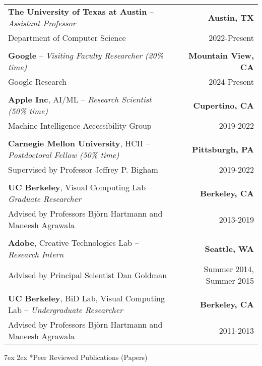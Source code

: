 \documentclass[letterpaper]{article}
\makeatletter
\renewcommand\section{\@startsection {section}{1}{\z@}%
      {7ex}%
      {2ex}%
      {\normalfont\Large\bfseries\SS@sectfont}}
\makeatother
\begin{document}
\begin{tabularx}{\textwidth}{Xr}

	\textbf{The University of Texas at Austin} -- \textit{Assistant Professor} & \textbf{Austin, TX} \\
	Department of Computer Science & 2022-Present \\
	\\

    \textbf{Google} -- \textit{Visiting Faculty Researcher (20\% time)} & \textbf{Mountain View, CA} \\
    Google Research & 2024-Present \\
    \\

	\textbf{Apple Inc}, AI/ML -- \textit{Research Scientist (50\% time)} & \textbf{Cupertino, CA} \\
	Machine Intelligence Accessibility Group & 2019-2022 \\
	\\

	\textbf{Carnegie Mellon University}, HCII -- \textit{Postdoctoral Fellow (50\% time)} & \textbf{Pittsburgh, PA} \\
	Supervised by Professor Jeffrey P. Bigham & 2019-2022 \\
	\\

	\textbf{UC Berkeley}, Visual Computing Lab -- \textit{Graduate Researcher} & \textbf{Berkeley, CA} \\
	Advised by Professors Björn Hartmann and Maneesh Agrawala & 2013-2019 \\
	\\

	\textbf{Adobe}, Creative Technologies Lab -- \textit{Research Intern} & \textbf{Seattle, WA} \\
	Advised by Principal Scientist Dan Goldman & Summer 2014, Summer 2015 \\
	\\

	\textbf{UC Berkeley}, BiD Lab, Visual Computing Lab -- \textit{Undergraduate Researcher} & \textbf{Berkeley, CA} \\
	Advised by Professors Björn Hartmann and Maneesh Agrawala & 2011-2013
\end{tabularx}

\section*{Peer Reviewed Publications (Papers)}
\end{document}
